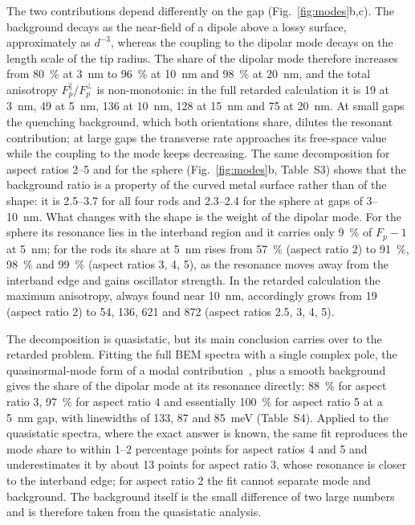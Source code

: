 \documentclass[11pt,a4paper]{article}
\newcommand{\Fp}{F_p}
\begin{document}
The two contributions depend differently on the gap (Fig.~\ref{fig:modes}b,c). The background decays as the
near-field of a dipole above a lossy surface, approximately as $d^{-3}$, whereas the coupling to the dipolar mode
decays on the length scale of the tip radius. The share of the dipolar mode therefore increases from
\SI{80}{\percent} at \SI{3}{nm} to \SI{96}{\percent} at \SI{10}{nm} and \SI{98}{\percent} at \SI{20}{nm}, and the
total anisotropy $\Fp^{\parallel}/\Fp^{\perp}$ is non-monotonic: in the full retarded calculation it is 19 at
\SI{3}{nm}, 49 at \SI{5}{nm}, 136 at \SI{10}{nm}, 128 at \SI{15}{nm} and 75 at \SI{20}{nm}. At small gaps the
quenching background, which both orientations share, dilutes the resonant contribution; at large gaps the
transverse rate approaches its free-space value while the coupling to the mode keeps decreasing. The same
decomposition for aspect ratios 2--5 and for the sphere (Fig.~\ref{fig:modes}b, Table~S3) shows that the
background ratio is a property of the curved metal surface rather than of the shape: it is 2.5--3.7 for all four
rods and 2.3--2.4 for the sphere at gaps of 3--\SI{10}{nm}. What changes with the shape is the weight of the
dipolar mode. For the sphere its resonance lies in the interband region and it carries only \SI{9}{\percent} of
$\Fp-1$ at \SI{5}{nm}; for the rods its share at \SI{5}{nm} rises from \SI{57}{\percent} (aspect ratio 2) to
\SI{91}{\percent}, \SI{98}{\percent} and \SI{99}{\percent} (aspect ratios 3, 4, 5), as the resonance moves away from
the interband edge and gains oscillator strength. In the retarded calculation the maximum anisotropy, always found
near \SI{10}{nm}, accordingly grows from 19 (aspect ratio 2) to 54, 136, 621 and 872 (aspect ratios 2.5, 3, 4,
5).

The decomposition is quasistatic, but its main conclusion carries over to the retarded problem. Fitting the full
BEM spectra with a single complex pole, the quasinormal-mode form of a modal contribution~\cite{sauvan,lalanne}, plus a
smooth background gives the share of the dipolar mode at its resonance directly: \SI{88}{\percent} for aspect ratio 3,
\SI{97}{\percent} for aspect ratio 4 and essentially \SI{100}{\percent} for aspect ratio 5 at a \SI{5}{nm} gap,
with linewidths of 133, 87 and \SI{85}{meV} (Table~S4). Applied to the quasistatic spectra, where the exact answer is
known, the same fit reproduces the mode share to within 1--2 percentage points for aspect ratios 4 and 5 and
underestimates it by about 13 points for aspect ratio 3, whose resonance is closer to the interband edge; for
aspect ratio 2 the fit cannot separate mode and background. The background itself is the small difference of two
large numbers and is therefore taken from the quasistatic analysis.
\end{document}

